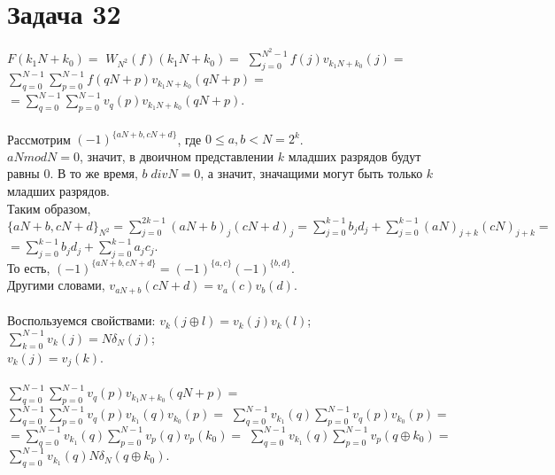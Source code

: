 \documentclass{article}
\title{}
\author{
	Дерюгин Денис, студент 561-й учебной группы
}
\date{\today}
\begin{document}
\maketitle
\setcounter{MaxMatrixCols}{20}

\large {
\section*{Задача 32}
$F(k_1 N + k_0) = $
$W_{N^2}(f)(k_1 N + k_0) = $
$\sum\limits_{j=0}^{N^2-1}f(j)v_{k_1 N + k_0}(j) = $
$\sum\limits_{q=0}^{N-1}\sum\limits_{p=0}^{N-1}f(qN + p) v_{k_1 N + k_0}(qN + p) = $\\
$= \sum\limits_{q=0}^{N-1}\sum\limits_{p=0}^{N-1}v_q(p)v_{k_1N + k_0}(qN+p)$.\\ \\
Рассмотрим $(-1)^{\{aN + b, cN + d\}}$, где $ 0 \leq a, b < N = 2^k$.\\
$aN mod N = 0$, значит, в двоичном представлении $k$ младших разрядов будут равны 0. В то же время, $b \;div N = 0$, а значит, значащими могут быть только $k$ младших разрядов.\\
Таким образом, $\{aN + b, cN + d\}_{N^2} = \sum\limits_{j = 0}^{2k - 1} (aN + b)_j(cN + d)_j = \sum\limits_{j = 0}^{k-1}b_j d_j + \sum\limits_{j=0}^{k-1}(aN)_{j+k}(cN)_{j+k} = $
$= \sum\limits_{j=0}^{k-1}b_j d_j + \sum\limits_{j=0}^{k-1}a_j c_j$.\\
То есть, $(-1)^{\{aN + b, cN + d\}} = (-1)^{\{a, c\}}(-1)^{\{b, d\}}$.\\
Другими словами, $v_{aN + b}(cN + d) = v_{a}(c)v_{b}(d)$.\\ \\
Воспользуемся свойствами:
$v_k(j \oplus l) = v_k(j)v_k(l)$;\\
$\sum\limits_{k=0}^{N-1}v_k(j) = N\delta_N(j)$;\\
$v_k(j) = v_j(k)$.\\ \\
%
%

$\sum\limits_{q=0}^{N-1}\sum\limits_{p=0}^{N-1}v_q(p)v_{k_1N + k_0}(qN+p) =$
$\sum\limits_{q=0}^{N-1}\sum\limits_{p=0}^{N-1}v_q(p)v_{k_1}(q)v_{k_0}(p) =$
$\sum\limits_{q=0}^{N-1}v_{k_1}(q)\sum\limits_{p=0}^{N-1}v_q(p)v_{k_0}(p) =$\\
$= \sum\limits_{q=0}^{N-1}v_{k_1}(q)\sum\limits_{p=0}^{N-1}v_p(q)v_{p}(k_0) =$
$\sum\limits_{q=0}^{N-1}v_{k_1}(q)\sum\limits_{p=0}^{N-1}v_p(q \oplus k_0) =$
$\sum\limits_{q=0}^{N-1}v_{k_1}(q)N\delta_N(q \oplus k_0).$\\ \\

}
\end{document}
